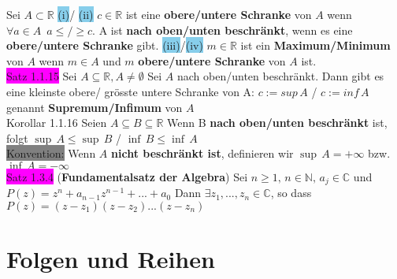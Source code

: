 \documentclass[landscape, 10pt]{article}
\newcommand{\R}{\mathbb{R}}
\newcommand{\N}{\mathbb{N}}
\newcommand{\C}{\mathbb{C}}
\begin{document}
\begin{multicols}{3}
                     Sei $A\subset\R$
                     \colorbox{SkyBlue}{(i)}/
                     \colorbox{SkyBlue}{(ii)} $c\in\R$ ist eine 
                     \textbf{obere/untere Schranke }
                     von $A$ wenn \textcolor{NavyBlue}{
                     $\forall a \in A \enspace a\leqslant / \geqslant c$}. A ist 
                     \textbf{nach oben/unten beschränkt}, wenn es eine 
                     \textbf{obere/untere Schranke} gibt. 
                     \colorbox{SkyBlue}{(iii)}/\colorbox{SkyBlue}{(iv)} $m\in\R$ ist ein 
                     \textbf{Maximum/Minimum} von $A$ wenn $m\in A$ und 
                     $m$ \textbf{obere/untere Schranke} von $A$ ist. \\
              \colorbox{magenta}{Satz 1.1.15}  
                     Sei $A\subseteq\R, A\neq\emptyset$ Sei $A$ 
                     nach oben/unten beschränkt. 
                     Dann gibt es eine kleinste obere/ grösste 
                     untere Schranke von A: \quad \textcolor{NavyBlue}{
                     $c:=sup\,A$ / $c:=inf\,A$}  genannt 
                     \textbf{Supremum/Infimum} von $A$ \\
              \colorbox{BurntOrange}{Korollar 1.1.16} 
                     Seien \textcolor{NavyBlue}{
                     $A\subseteq B\subseteq\R$} Wenn B \textbf{nach oben/unten 
                     beschränkt} ist, folgt \textcolor{NavyBlue}{
                     $\sup\,A\leqslant \sup\,B$ / $\inf\,B\leqslant \inf\,A$}\\
              \colorbox{gray}{Konvention:} 
                     Wenn $A$ \textbf{nicht beschränkt ist}, definieren wir 
                     \textcolor{NavyBlue}{$\sup\,A=+\infty$} bzw. 
                     \textcolor{NavyBlue}{$\inf\,A=-\infty$}\\
              \colorbox{magenta}{Satz 1.3.4} 
              (\textbf{Fundamentalsatz der Algebra}) 
                     Sei $n\geqslant 1,\,n\in\N,\,a_j\in\C$ und 
                     \textcolor{NavyBlue}{$P(z)=z^n+a_{n-1}z^{n-1}+...+a_0$}
                     Dann \textcolor{NavyBlue}{$\exists z_1,...,z_n\in\C$}, so dass 
                     \textcolor{NavyBlue}{$P(z)=(z-z_1)(z-z_2)...(z-z_n)$}
\section{Folgen und Reihen}

\end{multicols}
\end{document}

